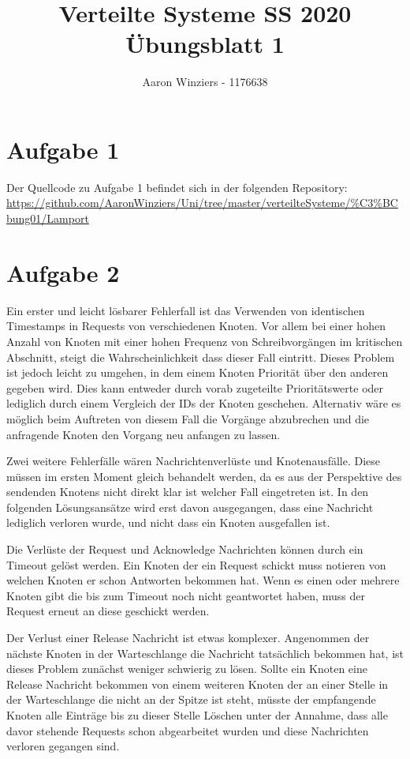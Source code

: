\documentclass[11pt,a4paper,parskip=half ]{scrartcl}
\author{Aaron Winziers - 1176638}
\title{Verteilte Systeme SS 2020\\\LARGE{Übungsblatt 1}}
\begin{document}
	\maketitle
	
\section*{Aufgabe 1}
	Der Quellcode zu Aufgabe 1 befindet sich in der folgenden Repository: \url{https://github.com/AaronWinziers/Uni/tree/master/verteilteSysteme/%C3%BCbung01/Lamport}
		
\section*{Aufgabe 2}
	Ein erster und leicht lösbarer Fehlerfall ist das Verwenden von identischen Timestamps in Requests von verschiedenen Knoten. Vor allem bei einer hohen Anzahl von Knoten mit einer hohen Frequenz von Schreibvorgängen im kritischen Abschnitt, steigt die Wahrscheinlichkeit dass dieser Fall eintritt. Dieses Problem ist jedoch leicht zu umgehen, in dem einem Knoten Priorität über den anderen gegeben wird. Dies kann entweder durch vorab zugeteilte Prioritätswerte oder lediglich durch einem Vergleich der IDs der Knoten geschehen. Alternativ wäre es möglich beim Auftreten von diesem Fall die Vorgänge abzubrechen und die anfragende Knoten den Vorgang neu anfangen zu lassen.
	
	Zwei weitere Fehlerfälle wären Nachrichtenverlüste und Knotenausfälle. Diese müssen im ersten Moment gleich behandelt werden, da es aus der Perspektive des sendenden Knotens nicht direkt klar ist welcher Fall eingetreten ist. In den folgenden Lösungsansätze wird erst davon ausgegangen, dass eine Nachricht lediglich verloren wurde, und nicht dass ein Knoten ausgefallen ist.
	
	Die Verlüste der Request und Acknowledge Nachrichten können durch ein Timeout gelöst werden. Ein Knoten der ein Request schickt muss notieren von welchen Knoten er schon Antworten bekommen hat. Wenn es einen oder mehrere Knoten gibt die bis zum Timeout noch nicht geantwortet haben, muss der Request erneut an diese geschickt werden.
	
	Der Verlust einer Release Nachricht ist etwas komplexer. Angenommen der nächste Knoten in der Warteschlange die Nachricht tatsächlich bekommen hat, ist dieses Problem zunächst weniger schwierig zu lösen. Sollte ein Knoten eine Release Nachricht bekommen von einem weiteren Knoten der an einer Stelle in der Warteschlange die nicht an der Spitze ist steht, müsste der empfangende Knoten alle Einträge bis zu dieser Stelle Löschen unter der Annahme, dass alle davor stehende Requests schon abgearbeitet wurden und diese Nachrichten verloren gegangen sind.
	
\end{document}
